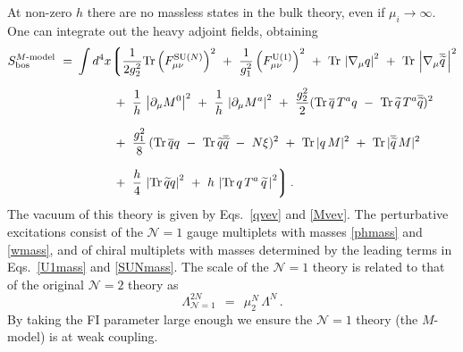 \documentclass[12pt]{article}
\def\beq{\begin{equation}}
\def\eeq{\end{equation}}
\def\Tr{{\rm Tr}}
\newcommand{\ntwo}{${\mathcal N}=2$ }
\newcommand{\none}{${\mathcal N}=1$ }
\newcommand{\p}{\partial}
\newcommand{\wt}{\widetilde}
\newcommand{\ov}{\overline}
\newcommand{\mc}[1]{\mathcal{#1}}
\begin{document}
	At non-zero $ h $ there are no massless states in the bulk theory, even
	if $ \mu_i \to \infty $.
	One can integrate out the heavy adjoint fields, obtaining
\begin{align}
\label{mmodel}
%
\notag
	S_{\rm bos}^\text{$M$-model} ~=~ & \int d^4 x 
		\biggl\lgroup
			\frac{1}{2g_2^2}\Tr \left(F_{\mu\nu}^\text{SU($N$)}\right)^2  ~+~
			\frac{1}{g_1^2} \left(F_{\mu\nu}^{\rm U(1)}\right)^2 ~+~ 
			\Tr\, \left| \nabla_\mu q \right|^2 ~+~ \Tr\,\left|\nabla_\mu \ov{\wt{q}}\, \right|^2 
			\\[2mm]
%
		&
\notag
			\phantom{\int d^4 x}
			~+~
			\frac{1}{h}\, \left| \p_\mu M^0 \right|^2  ~+~
			\frac{1}{h}\, \left| \p_\mu M^a \right|^2 ~+~
			\frac{g_2^2}{2} ( \Tr\, \ov{q}\, T^a q 
					~-~ \Tr\, \wt{q}\, T^a \ov{\wt{q}} )^2 
			\\[2mm]
%
\notag
		&
			\phantom{\int d^4 x}
			~+~
			\frac{g_1^2}{8}\, (\Tr\, \ov{q} q ~-~ \Tr\, \wt{q} \ov{\wt{q}} ~-~ N\xi )^2
			~+~
			\Tr\, |q\,M|^2 ~+~ \Tr\, |\ov{\wt{q}}\, M |^2
			\\[2mm]
%
		&
			\phantom{\int d^4 x}
			~+~
			\frac{h}{4}\, \left| \Tr\, \wt{q}q \right|^2  ~+~ 
			h\,\left| \Tr\, q\,T^a\,\wt{q} \,\right|^2
			\biggr\rgroup\,.	
\end{align}
	The vacuum of this theory is given by Eqs.~\eqref{qvev} and \eqref{Mvev}.
	The perturbative excitations consist of the \none gauge multiplets with masses
	\eqref{phmass} and \eqref{wmass}, and of chiral multiplets with masses determined by the 
	leading terms in Eqs.~\eqref{U1mass} and \eqref{SUNmass}.
	The scale of the \none theory is related to that of the original \ntwo theory as
\beq
	\Lambda_{\mc{N}=1}^{2N} ~~=~~ \mu_2^N\, \Lambda^N\,.
\label{Lambda}
\eeq
	By taking the FI parameter large enough we ensure the \none theory (the $M$-model) is at
	weak coupling.
	
\end{document}
